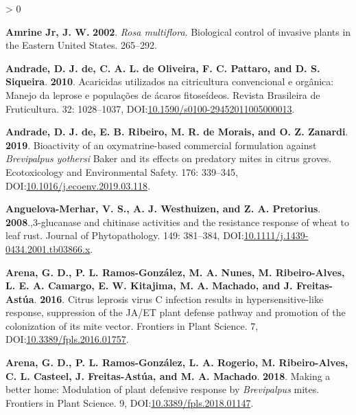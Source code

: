 \documentclass{ufdissertation}[overrideChapters] %
\newlength{\cslhangindent}
\newenvironment{CSLReferences}[2] %
 {%
  \setlength{\parindent}{0pt}
  \ifodd #1 \everypar{\setlength{\hangindent}{\cslhangindent}}\ignorespaces\fi
  \ifnum #2 > 0
  \setlength{\parskip}{#2\baselineskip}
  \fi
 }%
 {}
\begin{document}
{\begin{CSLReferences}{1}{1}
\leavevmode{}%
\textbf{Amrine Jr, J. W.} \textbf{2002}. {\emph{Rosa multiflora}}. Biological control of invasive plants in the Eastern {United States}. 265--292.

\leavevmode{}%
\textbf{Andrade, D. J. de, C. A. L. de Oliveira, F. C. Pattaro, and D. S. Siqueira}. \textbf{2010}. Acaricidas utilizados na citricultura convencional e org{â}nica: Manejo da leprose e popula{ç}{õ}es de {á}caros fitose{í}deos. Revista Brasileira de Fruticultura. 32: 1028--1037, DOI:\href{https://doi.org/10.1590/s0100-29452011005000013}{10.1590/s0100-29452011005000013}.

\leavevmode{}%
\textbf{Andrade, D. J. de, E. B. Ribeiro, M. R. de Morais, and O. Z. Zanardi}. \textbf{2019}. Bioactivity of an oxymatrine-based commercial formulation against {\emph{Brevipalpus yothersi}} {Baker} and its effects on predatory mites in citrus groves. Ecotoxicology and Environmental Safety. 176: 339--345, DOI:\href{https://doi.org/10.1016/j.ecoenv.2019.03.118}{10.1016/j.ecoenv.2019.03.118}.

\leavevmode{}%
\textbf{Anguelova-Merhar, V. S., A. J. Westhuizen, and Z. A. Pretorius}. \textbf{2008}.,3-glucanase and chitinase activities and the resistance response of wheat to leaf rust. Journal of Phytopathology. 149: 381--384, DOI:\href{https://doi.org/10.1111/j.1439-0434.2001.tb03866.x}{10.1111/j.1439-0434.2001.tb03866.x}.

\leavevmode{}%
\textbf{Arena, G. D., P. L. Ramos-González, M. A. Nunes, M. Ribeiro-Alves, L. E. A. Camargo, E. W. Kitajima, M. A. Machado, and J. Freitas-Astúa}. \textbf{2016}. {Citrus leprosis virus} {C} infection results in hypersensitive-like response, suppression of the {JA}/{ET} plant defense pathway and promotion of the colonization of its mite vector. Frontiers in Plant Science. 7, DOI:\href{https://doi.org/10.3389/fpls.2016.01757}{10.3389/fpls.2016.01757}.

\leavevmode{}%
\textbf{Arena, G. D., P. L. Ramos-González, L. A. Rogerio, M. Ribeiro-Alves, C. L. Casteel, J. Freitas-Astúa, and M. A. Machado}. \textbf{2018}. Making a better home: Modulation of plant defensive response by {\emph{Brevipalpus}} mites. Frontiers in Plant Science. 9, DOI:\href{https://doi.org/10.3389/fpls.2018.01147}{10.3389/fpls.2018.01147}.


\end{CSLReferences}}
\end{document}
